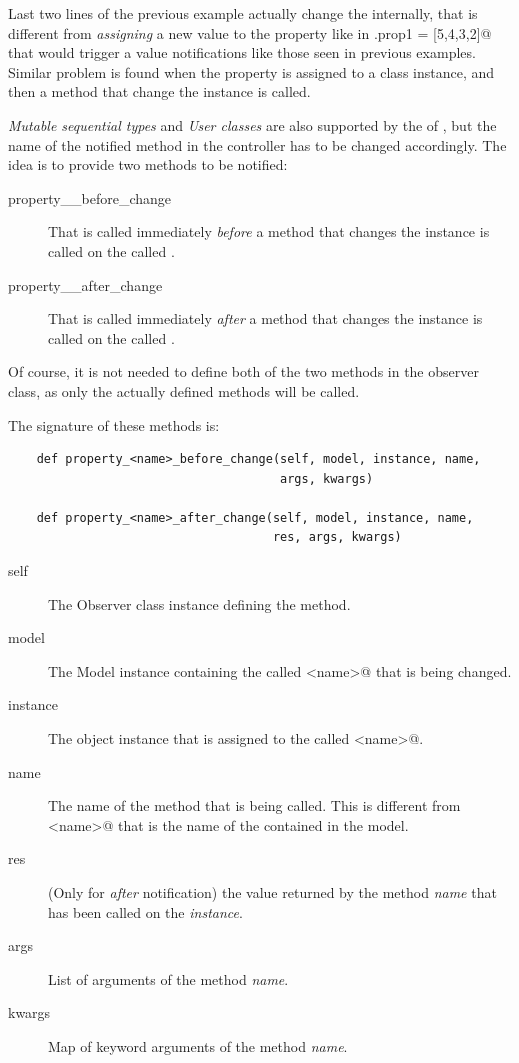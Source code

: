 Last two lines of the previous example actually change the \OP
internally, that is different from \emph{assigning} a new value to the
property like in \verb@m.prop1 = [5,4,3,2]@ that would trigger a value
notifications like those seen in previous examples.  Similar problem
is found when the property is assigned to a class instance, and then a
method that change the instance is called.

\emph{Mutable sequential types} and \emph{User classes} are also
supported by the \obs of \pygtkmvc, but the name of the notified
method in the controller has to be changed accordingly.
The idea is to provide two methods to be notified:
\begin{description}
\item[property\_\_before\_change] That is called
  immediately \emph{before} a method that changes the instance is
  called on the \OP called .
\item[property\_\_after\_change] That is called
  immediately \emph{after} a method that changes the instance is
  called on the \OP called .
\end{description}

Of course, it is not needed to define both of the two methods in the
observer class, as only the actually defined methods will be called. 

The signature of these methods is:
{ \codesize 
\begin{verbatim} 
    def property_<name>_before_change(self, model, instance, name,
                                      args, kwargs)

    def property_<name>_after_change(self, model, instance, name, 
                                     res, args, kwargs)
\end{verbatim}
}

\begin{description}
\item[self] The Observer class instance defining the method.
\item[model] The Model instance containing the \OP called
  \verb@<name>@ that is being changed.
\item[instance] The object instance that is assigned to the \OP called
  \verb@<name>@.
\item[name] The name of the method that is being called. This
  is different from \verb@<name>@ that is the name of the \OP
  contained in the model. 
\item[res] (Only for \emph{after} notification) the value returned by
  the method \emph{name} that has been called on the \OP
  \emph{instance}.
\item[args] List of arguments of the method \emph{name}.
\item[kwargs] Map of keyword arguments of the method \emph{name}.
\end{description}


